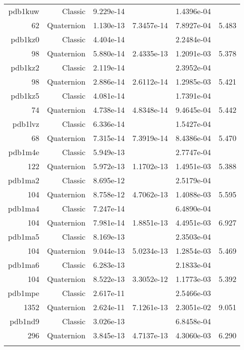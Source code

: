 \begin{xltabular}{\textwidth}{r|rS[table-format=1.3e+2]S[table-format=1.4e+2]S[table-format=1.4e+2]S[table-format=-1.3]}
pdb1kuw & Classic & 9.229e-14 &  & 1.4396e-04 & \\
62 & Quaternion & 1.130e-13 & 7.3457e-14 & 7.8927e-04 & 5.483\\  \addlinespace
pdb1kz0 & Classic & 4.404e-14 &  & 2.2484e-04 & \\
98 & Quaternion & 5.880e-14 & 2.4335e-13 & 1.2091e-03 & 5.378\\  \addlinespace
pdb1kz2 & Classic & 2.119e-14 &  & 2.3952e-04 & \\
98 & Quaternion & 2.886e-14 & 2.6112e-14 & 1.2985e-03 & 5.421\\  \addlinespace
pdb1kz5 & Classic & 4.081e-14 &  & 1.7391e-04 & \\
74 & Quaternion & 4.738e-14 & 4.8348e-14 & 9.4645e-04 & 5.442\\  \addlinespace
pdb1lvz & Classic & 6.336e-14 &  & 1.5427e-04 & \\
68 & Quaternion & 7.315e-14 & 7.3919e-14 & 8.4386e-04 & 5.470\\  \addlinespace
pdb1m4e & Classic & 5.949e-13 &  & 2.7747e-04 & \\
122 & Quaternion & 5.972e-13 & 1.1702e-13 & 1.4951e-03 & 5.388\\  \addlinespace
pdb1ma2 & Classic & 8.695e-12 &  & 2.5179e-04 & \\
104 & Quaternion & 8.758e-12 & 4.7062e-13 & 1.4088e-03 & 5.595\\  \addlinespace
pdb1ma4 & Classic & 7.247e-14 &  & 6.4890e-04 & \\
104 & Quaternion & 7.981e-14 & 1.8851e-13 & 4.4951e-03 & 6.927\\  \addlinespace
pdb1ma5 & Classic & 8.169e-13 &  & 2.3503e-04 & \\
104 & Quaternion & 9.044e-13 & 5.0234e-13 & 1.2854e-03 & 5.469\\  \addlinespace
pdb1ma6 & Classic & 6.283e-13 &  & 2.1833e-04 & \\
104 & Quaternion & 8.522e-13 & 3.3052e-12 & 1.1773e-03 & 5.392\\  \addlinespace
pdb1mpe & Classic & 2.617e-11 &  & 2.5466e-03 & \\
1352 & Quaternion & 2.624e-11 & 7.1261e-13 & 2.3051e-02 & 9.051\\  \addlinespace
pdb1nd9 & Classic & 3.026e-13 &  & 6.8458e-04 & \\
296 & Quaternion & 3.845e-13 & 4.7137e-13 & 4.3060e-03 & 6.290\\  \addlinespace

\end{xltabular}
